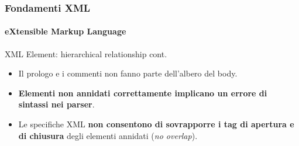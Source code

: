 \begin{frame}
    \frametitle{Fondamenti XML}
    \framesubtitle{eXtensible Markup Language}
    \addtocounter{nframe}{1}

	\begin{block}{XML Element: hierarchical relationship cont.}
		\begin{itemize}
			\item Il prologo e i commenti non fanno parte dell'albero del body.
			\item \textbf{Elementi non annidati correttamente implicano un errore di sintassi nei parser}.
			\item Le specifiche XML \textbf{non consentono di sovrapporre i tag di apertura e di chiusura} degli elementi annidati (\textit{no overlap}).
		\end{itemize}
	\end{block}

\end{frame}









